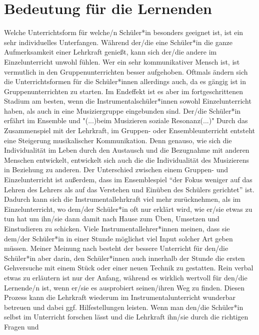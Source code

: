 \section{Bedeutung für die Lernenden}
Welche Unterrichtsform für welche/n Schüler*in besonders geeignet ist, ist ein sehr
individuelles Unterfangen. Während der/die eine Schüler*in die ganze Aufmerksamkeit
einer Lehrkraft genießt, kann sich der/die andere im Einzelunterricht unwohl fühlen.
Wer ein sehr kommunikativer Mensch ist, ist vermutlich in den
Gruppenunterrichten besser aufgehoben. Oftmals ändern sich die Unterrichtsformen
für die Schüler*innen allerdings auch, da es gängig ist in Gruppenunterrichten zu
starten. Im Endeffekt ist es aber im fortgeschrittenen Stadium am besten, wenn
die Instrumentalschüler*innen sowohl Einzelunterricht haben, als auch in eine
Musiziergruppe eingebunden sind. Der/die Schüler*in erfährt im Ensemble und "(...)beim
Musizieren soziale Resonanz(...)" \autocite[28]{mitzscherlich:musikpsychologie}
Durch das Zusammenspiel mit der Lehrkraft, im Gruppen- oder Ensembleunterricht
entsteht eine Steigerung musikalischer Kommunikation.
\autocite[99]{mitzscherlich:musikpsychologie} Denn genauso, wie sich die
Individualität im Leben durch den Austausch und die Bezugnahme mit anderen
Menschen entwickelt, entwickelt sich auch die die Individualität des Musizierens
in Beziehung zu anderen. Der Unterschied zwischen einem Gruppen- und
Einzelunterricht ist außerdem, dass im Ensemblespiel \enquote{der Fokus weniger auf das
Lehren des Lehrers als auf das Verstehen und Einüben des Schülers gerichtet}
ist. \autocite[31]{losert:die_kunst_zu_unterrichten} Dadurch kann sich die
Instrumentallehrkraft viel mehr zurücknehmen, als im Einzelunterricht, wo dem/der
Schüler*in oft nur erklärt wird, wie er/sie etwas zu tun hat um ihn/sie dann damit nach
Hause zum Üben, Umsetzen und Einstudieren zu schicken. Viele Instrumentallehrer*innen
meinen, dass sie dem/der Schüler*in in einer Stunde möglichst viel Input solcher Art
geben müssen. Meiner Meinung nach besteht der bessere Unterricht für den/die Schüler*in
aber darin, den Schüler*innen auch innerhalb der Stunde die ersten Gehversuche mit
einem Stück oder einer neuen Technik zu gestatten. Rein verbal etwas zu
erläutern ist nur der Anfang, während es wirklich wertvoll für den/die Lernende/n
ist, wenn er/sie es ausprobiert seinen/ihren Weg zu finden. Diesen Prozess kann die
Lehrkraft wiederum im Instrumentalunterricht wunderbar betreuen und dabei
ggf. Hilfestellungen leisten. 
Wenn man den/die Schüler*in selbst
im Unterricht forschen lässt und die Lehrkraft ihn/sie durch die richtigen Fragen und
